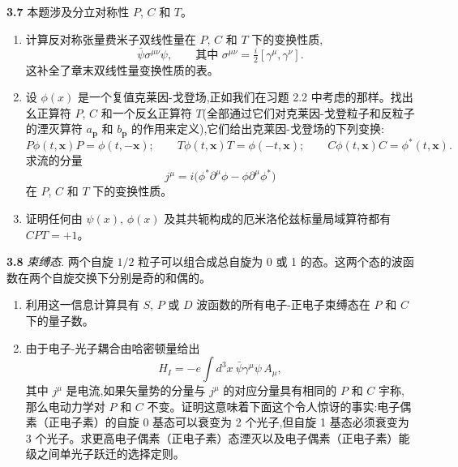 \textbf{3.7} 本题涉及分立对称性 $P$, $C$ 和 $T$。
\begin{enumerate}[label=(\alph*)]
  \item 计算反对称张量费米子双线性量在 $P$, $C$ 和 $T$ 下的变换性质,
    \begin{equation}
      \bar{\psi}\sigma^{\mu\nu}\psi,\qquad
      \text{其中 } \sigma^{\mu\nu} = \tfrac{i}{2}[\gamma^\mu, \gamma^\nu] .
    \end{equation}
    这补全了章末双线性量变换性质的表。
  \item 设 $\phi(x)$ 是一个复值克莱因-戈登场,正如我们在习题 2.2 中考虑的那样。找出幺正算符 $P$, $C$ 和一个反幺正算符 $T$(全部通过它们对克莱因-戈登粒子和反粒子的湮灭算符 $a_{\mathbf{p}}$ 和 $b_{\mathbf{p}}$ 的作用来定义),它们给出克莱因-戈登场的下列变换:
    \begin{equation}
      P\phi(t,\mathbf{x})P = \phi(t,-\mathbf{x});\qquad
      T\phi(t,\mathbf{x})T = \phi(-t,\mathbf{x});\qquad
      C\phi(t,\mathbf{x})C = \phi^{*}(t,\mathbf{x}) .
    \end{equation}
    求流的分量
    \begin{equation}
      j^\mu = i\bigl( \phi^{*}\partial^\mu\phi - \phi\partial^\mu\phi^{*} \bigr)
    \end{equation}
    在 $P$, $C$ 和 $T$ 下的变换性质。
  \item 证明任何由 $\psi(x)$, $\phi(x)$ 及其共轭构成的厄米洛伦兹标量局域算符都有 $CPT = +1$。
\end{enumerate}

\textbf{3.8} \emph{束缚态}.  两个自旋 $1/2$ 粒子可以组合成总自旋为 0 或 1 的态。这两个态的波函数在两个自旋交换下分别是奇的和偶的。
\begin{enumerate}[label=(\alph*)]
  \item 利用这一信息计算具有 $S$, $P$ 或 $D$ 波函数的所有电子-正电子束缚态在 $P$ 和 $C$ 下的量子数。
  \item 由于电子-光子耦合由哈密顿量给出
    \begin{equation}
      H_I = -e\int d^3x\ \bar{\psi}\gamma^\mu\psi\,A_\mu,
    \end{equation}
    其中 $j^\mu$ 是电流,如果矢量势的分量与 $j^\mu$ 的对应分量具有相同的 $P$
    和 $C$ 宇称,那么电动力学对 $P$ 和 $C$ 不变。证明这意味着下面这个令人惊讶的事实:电子偶素（正电子素）的自旋 0 基态可以衰变为 2 个光子,但自旋 1 基态必须衰变为 3 个光子。求更高电子偶素（正电子素）态湮灭以及电子偶素（正电子素）能级之间单光子跃迁的选择定则。
\end{enumerate}
